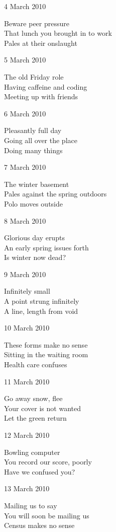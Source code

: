 \documentclass[12pt]{article}
\begin{document}
\newpage

4 March 2010

Beware peer pressure \\
That lunch you brought in to work \\
Pales at their onslaught

5 March 2010

The old Friday role \\
Having caffeine and coding \\
Meeting up with friends

6 March 2010

Pleasantly full day \\
Going all over the place \\
Doing many things

7 March 2010

The winter basement \\
Pales against the spring outdoors \\
Polo moves outside

8 March 2010

Glorious day erupts \\
An early spring issues forth \\
Is winter now dead?

9 March 2010

Infinitely small \\
A point strung infinitely \\
A line, length from void

10 March 2010

These forms make no sense \\
Sitting in the waiting room \\
Health care confuses

\newpage

11 March 2010

Go away snow, flee \\
Your cover is not wanted \\
Let the green return

12 March 2010

Bowling computer \\
You record our score, poorly \\
Have we confused you?

13 March 2010

Mailing us to say \\
You will soon be mailing us \\
Census makes no sense
\end{document}
